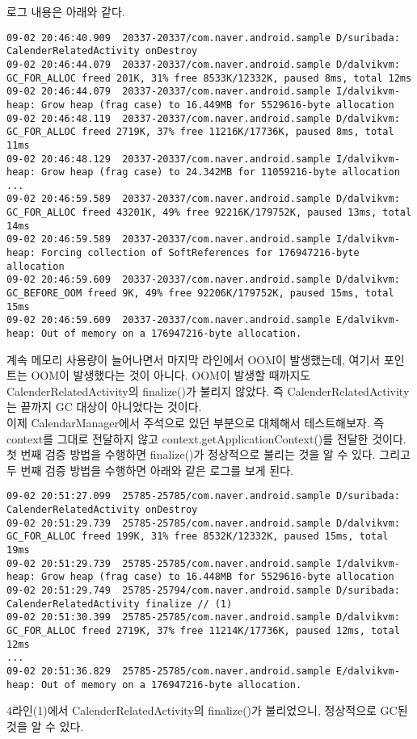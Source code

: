 로그 내용은 아래와 같다.
\begin{lstlisting}[frame=single]
09-02 20:46:40.909  20337-20337/com.naver.android.sample D/suribada: CalenderRelatedActivity onDestroy
09-02 20:46:44.079  20337-20337/com.naver.android.sample D/dalvikvm: GC_FOR_ALLOC freed 201K, 31% free 8533K/12332K, paused 8ms, total 12ms
09-02 20:46:44.079  20337-20337/com.naver.android.sample I/dalvikvm-heap: Grow heap (frag case) to 16.449MB for 5529616-byte allocation
09-02 20:46:48.119  20337-20337/com.naver.android.sample D/dalvikvm: GC_FOR_ALLOC freed 2719K, 37% free 11216K/17736K, paused 8ms, total 11ms
09-02 20:46:48.129  20337-20337/com.naver.android.sample I/dalvikvm-heap: Grow heap (frag case) to 24.342MB for 11059216-byte allocation
...
09-02 20:46:59.589  20337-20337/com.naver.android.sample D/dalvikvm: GC_FOR_ALLOC freed 43201K, 49% free 92216K/179752K, paused 13ms, total 14ms
09-02 20:46:59.589  20337-20337/com.naver.android.sample I/dalvikvm-heap: Forcing collection of SoftReferences for 176947216-byte allocation
09-02 20:46:59.609  20337-20337/com.naver.android.sample D/dalvikvm: GC_BEFORE_OOM freed 9K, 49% free 92206K/179752K, paused 15ms, total 15ms
09-02 20:46:59.609  20337-20337/com.naver.android.sample E/dalvikvm-heap: Out of memory on a 176947216-byte allocation.
\end{lstlisting}

계속 메모리 사용량이 늘어나면서 마지막 라인에서 OOM이 발생했는데, 여기서 포인트는 OOM이 발생했다는 것이 아니다.
OOM이 발생할 때까지도 CalenderRelatedActivity의 finalize()가 불리지 않았다.
즉 CalenderRelatedActivity는 끝까지 GC 대상이 아니었다는 것이다.\\

이제 CalendarManager에서 주석으로 있던 부분으로 대체해서 테스트해보자.
즉 context를 그대로 전달하지 않고 context.getApplicationContext()를 전달한 것이다.
첫 번째 검증 방법을 수행하면 finalize()가 정상적으로 불리는 것을 알 수 있다.
그리고 두 번째 검증 방법을 수행하면 아래와 같은 로그를 보게 된다.
\begin{lstlisting}[frame=single]
09-02 20:51:27.099  25785-25785/com.naver.android.sample D/suribada: CalenderRelatedActivity onDestroy
09-02 20:51:29.739  25785-25785/com.naver.android.sample D/dalvikvm: GC_FOR_ALLOC freed 199K, 31% free 8532K/12332K, paused 15ms, total 19ms
09-02 20:51:29.739  25785-25785/com.naver.android.sample I/dalvikvm-heap: Grow heap (frag case) to 16.448MB for 5529616-byte allocation
09-02 20:51:29.749  25785-25794/com.naver.android.sample D/suribada: CalenderRelatedActivity finalize // (1)
09-02 20:51:30.399  25785-25785/com.naver.android.sample D/dalvikvm: GC_FOR_ALLOC freed 2719K, 37% free 11214K/17736K, paused 12ms, total 12ms
...
09-02 20:51:36.829  25785-25785/com.naver.android.sample E/dalvikvm-heap: Out of memory on a 176947216-byte allocation.
\end{lstlisting}
4라인(1)에서  CalenderRelatedActivity의 finalize()가 불리었으니, 정상적으로 GC된 것을 알 수 있다.

